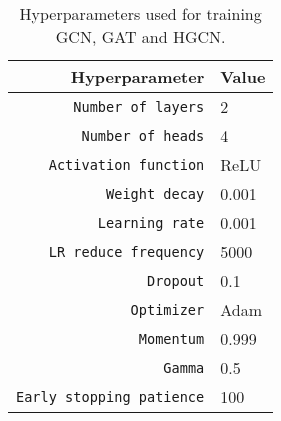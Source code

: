 \begin{table}
    \centering
    \caption{Hyperparameters used for training GCN, GAT and HGCN.}
    \label{tab:hyperparams}
    \begin{tabular}{rl}
        \toprule
        \textbf{Hyperparameter} & \textbf{Value} \\
        \midrule
        \texttt{Number of layers} & 2 \\
        \texttt{Number of heads} &  4 \\
        \texttt{Activation function} & ReLU \\
        \texttt{Weight decay} & 0.001 \\
        \texttt{Learning rate} & 0.001 \\
        \texttt{LR reduce frequency} & 5000 \\
        \texttt{Dropout} & 0.1 \\
        \texttt{Optimizer} & Adam \\
        \texttt{Momentum} & 0.999 \\
        \texttt{Gamma} & 0.5 \\        
        \texttt{Early stopping patience} & 100 \\
        \bottomrule
    \end{tabular}
\end{table}
